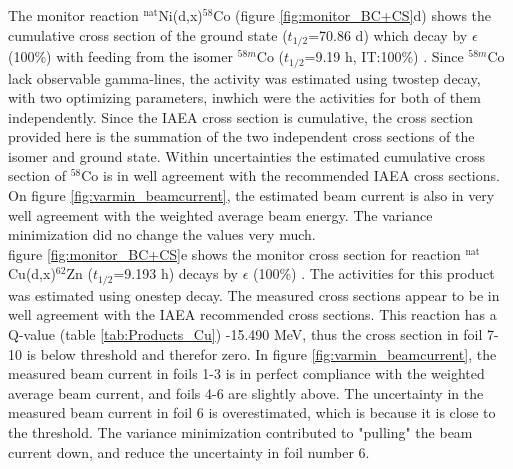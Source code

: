 \documentclass[a4paper,11pt,twoside]{book}
\begin{document}
\noindent 
The monitor reaction $^\text{nat}$Ni(d,x)$^{58}$Co (figure \ref{fig:monitor_BC+CS}d) shows the cumulative cross section of the ground state ($t_{1/2}$=70.86 d) which decay by $\epsilon$ (100\%) with feeding from the isomer $^{58m}$Co ($t_{1/2}$=9.19 h, IT:100\%) \cite{Nesaraja2010}. Since $^{58m}$Co lack observable gamma-lines, the activity was estimated using twostep decay, with two optimizing parameters, inwhich were the activities for both of them independently. Since the IAEA cross section is cumulative, the cross section provided here is the summation of the two independent cross sections of the isomer and ground state. Within uncertainties the estimated cumulative cross section of $^{58}$Co is in well agreement with the recommended IAEA cross sections. On figure \ref{fig:varmin_beamcurrent}, the estimated beam current is also in very well agreement with the weighted average beam energy. The variance minimization did no change the values very much.    \\

\noindent
figure \ref{fig:monitor_BC+CS}e shows the monitor cross section for reaction $^\text{nat}$Cu(d,x)$^{62}$Zn ($t_{1/2}$=9.193 h) decays by $\epsilon$ (100\%) \cite{Nichols2012}. The activities for this product was estimated using onestep decay. The measured cross sections appear to be in well agreement with the IAEA recommended cross sections. This reaction has a Q-value (table \ref{tab:Products_Cu}) -15.490 MeV, thus the cross section in foil 7-10 is below threshold and therefor zero. In figure \ref{fig:varmin_beamcurrent}, the measured beam current in foils 1-3 is in perfect compliance with the weighted average beam current, and foils 4-6 are slightly above. The uncertainty in the measured beam current in foil 6 is overestimated, which is because it is close to the threshold. The variance minimization contributed to "pulling" the beam current down, and reduce the uncertainty in foil number 6. \\
\end{document}
